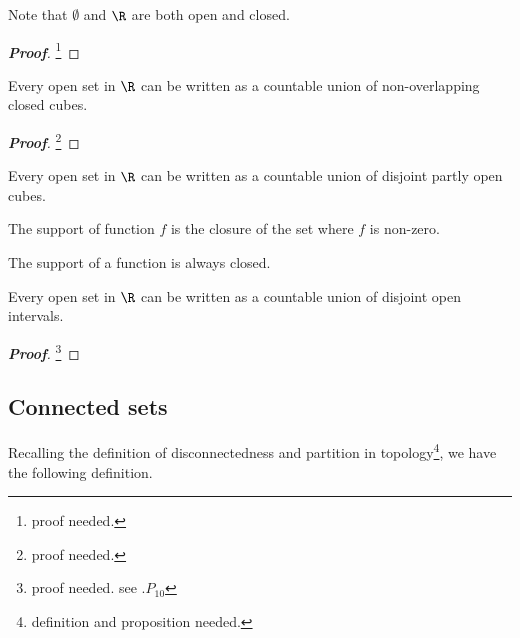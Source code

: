 \begin{proposition}
Note that $\emptyset$ and $\R$ are both open and closed.
\end{proposition}

\begin{proof}[\bf Proof]
\footnote{proof needed.}
\end{proof}

\begin{theorem}\label{thm:open_set_real_n_can_be_countable_union_of_non_overlapping_closed_cubes}
Every open set in $\R$ can be written as a countable union of non-overlapping closed cubes.
\end{theorem}

\begin{proof}[\bf Proof]
\footnote{proof needed.}
\end{proof}

\begin{theorem}
Every open set in $\R$ can be written as a countable union of disjoint partly open cubes.
\end{theorem}

\begin{definition}
The support of function $f$ is the closure of the set where $f$ is non-zero.
\end{definition}

\begin{remark}
The support of a function is always closed.
\end{remark}

\begin{theorem}
Every open set in $\R$ can be written as a countable union of disjoint open intervals.
\end{theorem}

\begin{proof}[\bf Proof]
\footnote{proof needed. see \cite{Wheeden_Zygmund_2015}.$P_{10}$}
\end{proof}



\subsection{Connected sets}

Recalling the definition of disconnectedness and partition in topology\footnote{definition and proposition needed.}, we have the following definition.

